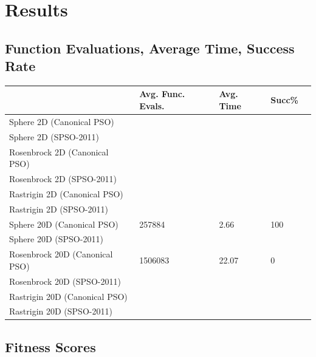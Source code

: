 \documentclass{csfourzero}
\begin{document}
\section{Results}

\subsection{Function Evaluations, Average Time, Success Rate}

\begin{center}
  \begin{tabular}{lllll}
  \hline
  ~                              & Avg. Func. Evals. & Avg. Time   & Succ\% \\ \hline
  Sphere 2D (Canonical PSO)      &                   &             & ~                & \\
  Sphere 2D (SPSO-2011)          &                   &             & ~                & \\
  Rosenbrock 2D (Canonical PSO)  &                   &             & ~                & \\
  Rosenbrock 2D (SPSO-2011)      &                   &             & ~                & \\
  Rastrigin 2D (Canonical PSO)   &                   &             & ~                & \\
  Rastrigin 2D (SPSO-2011)       &                   &             & ~                & \\
  Sphere 20D (Canonical PSO)     & \num{257884}      & \num{2.66}  & 100              & \\
  Sphere 20D (SPSO-2011)         &                   &             & ~                & \\
  Rosenbrock 20D (Canonical PSO) & \num{1506083}     & \num{22.07} & 0                & \\
  Rosenbrock 20D (SPSO-2011)     &                   &             & ~                & \\
  Rastrigin 20D (Canonical PSO)  &                   &             & ~                & \\
  Rastrigin 20D (SPSO-2011)      &                   &             & ~                & \\
  \end{tabular}
\end{center}

\subsection{Fitness Scores}
\end{document}
